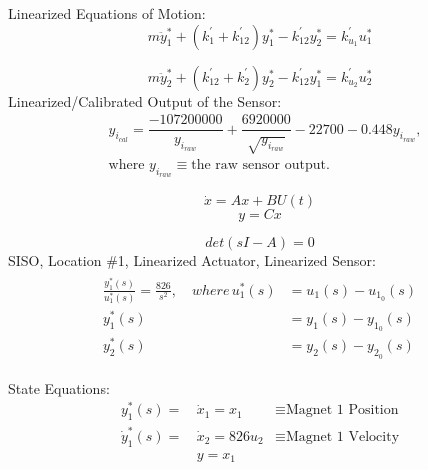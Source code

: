 \documentclass[12pt]{report}
\begin{document}
Linearized Equations of Motion:
\begin{equation}
m\ddot{y}_{1}^{*} + (k^{'}_{1} + k^{'}_{12})y_{1}^{*} - k^{'}_{12}y_{2}^{*} = k^{'}_{u_{1}}u^{*}_{1}
\end{equation}

\begin{equation}
m\ddot{y}_{2}^{*} + (k^{'}_{12} + k^{'}_{2})y_{2}^{*} - k^{'}_{12}y_{1}^{*} = k^{'}_{u_{2}}u^{*}_{2}
\end{equation}
\newline
Linearized/Calibrated Output of the Sensor:
\begin{align}
&y_{i_{cal}} =\dfrac{-107200000}{y_{i_{raw}}} + \dfrac{6920000}{\sqrt{y_{i_{raw}}}} -22700 -0.448y_{i_{raw}},\\ 
&\text{where } y_{i_{raw}} \equiv \text{the raw sensor output.} 
\end{align}

\begin{equation}
\dot{x}= Ax + BU(t)
\end{equation}
\begin{equation}
y = Cx
\end{equation}

\begin{equation}
det(sI - A) = 0
\end{equation}
\newline
SISO, Location \#1, Linearized Actuator, Linearized Sensor:
\begin{align} 
\begin{split}
\frac{y_{1}^{*}(s)}{u_{1}^{*}(s)} = \frac{826}{s^{2}}
, \quad where \, u_{1}^{*}(s) &= u_{1}(s) - u_{1_{0}}(s)\\
y_{1}^{*}(s) &= y_{1}(s) - y_{1_{0}}(s)\\
y_{2}^{*}(s) &= y_{2}(s) - y_{2_{0}}(s)
\end{split}
\end{align}

State Equations:
\begin{align} 
y_{1}^{*}(s) = \,&\dot{x}_{1} = x _{1} &\equiv \text{Magnet 1 Position} \\
\dot{y}_{1}^{*}(s) = \,&\dot{x}_{2} = 826u _{2} &\equiv \text{Magnet 1 Velocity}\\
&y = x _{1}
\end{align}
\end{document}
